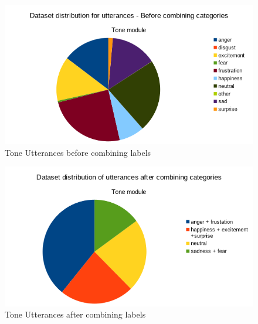 \documentclass[oneside,a4paper,12pt]{report}
\begin{document}
\begin{normalsize}
\begin{itemize}
\begin{itemize}
			\end{itemize}
		
		\begin{center}
			\begin{figure}[!htbp]
				\centering
				\includegraphics[width=\textwidth]{tone-utterances-before-combining.png}
				\caption{Tone Utterances before combining labels}
				\label{fig:tone_utter_before}
			\end{figure}
		\end{center}  
		\vspace{5mm}
		\begin{center}
			\begin{figure}[!htbp]
				\centering
				\includegraphics[width=\textwidth]{tone-utterances-after-combining.png}
				\caption{Tone Utterances after combining labels}
				\label{fig:tone_utter_after}
			\end{figure}
		\end{center}
	

\end{itemize}
\end{normalsize}
\end{document}

